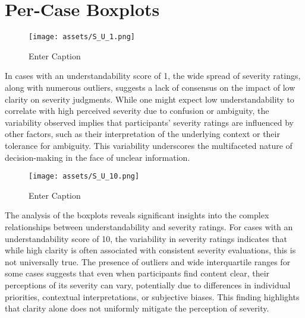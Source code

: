\section{Per-Case Boxplots}

\begin{figure}
    \centering
    \texttt{[image: assets/S\_U\_1.png]}
    \caption{Enter Caption}
\end{figure}
In cases with an understandability score of 1, the wide spread of severity ratings, along with numerous outliers, suggests a lack of consensus on the impact of low clarity on severity judgments. While one might expect low understandability to correlate with high perceived severity due to confusion or ambiguity, the variability observed implies that participants’ severity ratings are influenced by other factors, such as their interpretation of the underlying context or their tolerance for ambiguity. This variability underscores the multifaceted nature of decision-making in the face of unclear information.

\begin{figure}
    \centering
    \texttt{[image: assets/S\_U\_10.png]}
    \caption{Enter Caption}
\end{figure}
The analysis of the boxplots reveals significant insights into the complex relationships between understandability and severity ratings. For cases with an understandability score of 10, the variability in severity ratings indicates that while high clarity is often associated with consistent severity evaluations, this is not universally true. The presence of outliers and wide interquartile ranges for some cases suggests that even when participants find content clear, their perceptions of its severity can vary, potentially due to differences in individual priorities, contextual interpretations, or subjective biases. This finding highlights that clarity alone does not uniformly mitigate the perception of severity.

